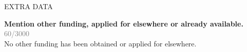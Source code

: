 \documentclass[11pt,dvipsnames,usenames,a4paper]{article}
\begin{document}

\vspace{10pt}

\begin{shaded}\centering EXTRA DATA \end{shaded}

\textbf{Mention other funding, applied for elsewhere or already available.}\\
\textcolor{Gray}{60/3000}\\[6pt]
No other funding has been obtained or applied for elsewhere.


\end{document}
